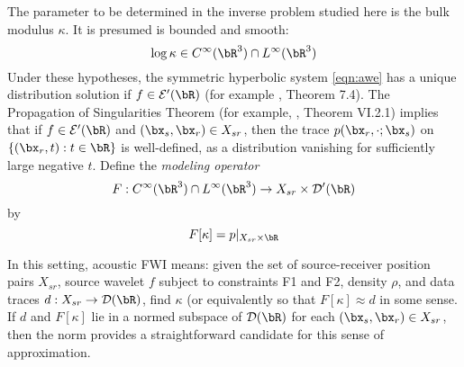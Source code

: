 The parameter to be determined in the inverse problem studied here is
the bulk modulus $\kappa$. It is presumed is bounded and smooth:
\begin{equation}
  \label{eqn:coeff}
  \log \kappa \in C^{\infty}(\bR^3) \cap L^{\infty}(\bR^3)
\end{equation}
Under these hypotheses, the symmetric hyperbolic system \ref{eqn:awe}
has a unique distribution
solution if $f \in \cal{E}'(\bR)$ (for example \cite{Lax:PDENotes},
Theorem 7.4). The Propagation of
Singularities Theorem (for example, \cite{Tay:81}, Theorem VI.2.1)
implies that if $f \in \cal{E}'(\bR)$ and $(\bx_s,\bx_r) \in X_{sr}$,
then the trace $p(\bx_r, \cdot;\bx_s)$ on $\{(\bx_r,t): t \in \bR\}$ is well-defined,
as a distribution vanishing for sufficiently large
negative $t$. Define the {\em modeling operator}
\begin{equation}
  \label{eqn:modop}
  F: C^{\infty}(\bR^3) \cap L^{\infty}(\bR^3)
  \rightarrow X_{sr} \times {\cal D}'(\bR)
\end{equation}
by
\begin{equation}
  \label{eqn:modopdef}
  F[\kappa]= p|_{X_{sr} \times \bR}
\end{equation}

In this setting, acoustic FWI means: given the set of
source-receiver position pairs $X_{sr}$, source wavelet
$f$ subject to constraints F1 and F2,  density $\rho$, and data traces
$d:  X_{sr} \rightarrow \cal{D}(\bR)$, find $\kappa$ (or equivalently
so that $F[\kappa] \approx d$ in some sense. If
$d$ and $F[\kappa]$ lie in a normed subspace of $\cal{D}(\bR)$ for each
$(\bx_s,\bx_r) \in X_{sr}$, then the
norm provides a straightforward candidate for this sense of
approximation.


